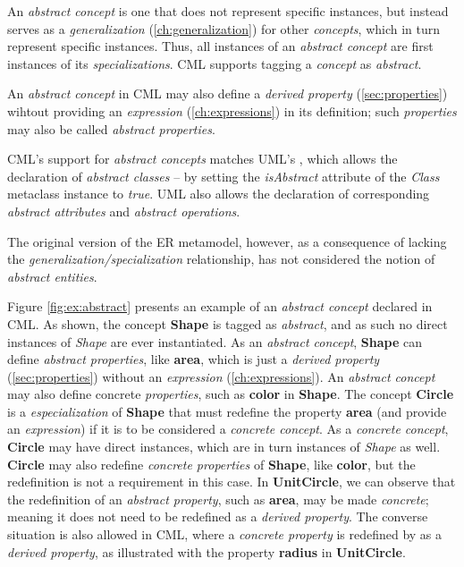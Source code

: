 An \emph{abstract concept} is one that does not represent specific instances,
but instead serves as a \emph{generalization} (\ref{ch:generalization}) 
for other \emph{concepts},
which in turn represent specific instances.
Thus, all instances of an \emph{abstract concept}
are first instances of its \emph{specializations}.
CML supports tagging a \emph{concept} as \emph{abstract}.

An \emph{abstract concept} in CML may also define a \emph{derived property} (\ref{sec:properties})
wihtout providing an \emph{expression} (\ref{ch:expressions}) in its definition;
such \emph{properties} may also be called \emph{abstract properties}.

CML's support for \emph{abstract concepts} matches UML's \cite{uml},
which allows the declaration of \emph{abstract classes}
-- by setting the \emph{isAbstract} attribute of the \emph{Class} metaclass instance to \emph{true}.
UML also allows the declaration of corresponding \emph{abstract attributes} and \emph{abstract operations}.

The original version of the ER \cite{er} metamodel, however,
as a consequence of lacking the \emph{generalization/specialization} relationship,
has not considered the notion of \emph{abstract entities}.

\begin{examples}
Figure \ref{fig:ex:abstract} presents an example of an \emph{abstract concept} declared in CML.
As shown, the concept \textbf{Shape} is tagged as \emph{abstract},
and as such no direct instances of \emph{Shape} are ever instantiated.
As an \emph{abstract concept}, \textbf{Shape} can define \emph{abstract properties},
like \textbf{area}, which is just a \emph{derived property} (\ref{sec:properties})
without an \emph{expression} (\ref{ch:expressions}).
An \emph{abstract concept} may also define concrete \emph{properties},
such as \textbf{color} in \textbf{Shape}.
The concept \textbf{Circle} is a \emph{especialization} of \textbf{Shape}
that must redefine the property \textbf{area}
(and provide an \emph{expression})
if it is to be considered a \emph{concrete concept}.
As a \emph{concrete concept},
\textbf{Circle} may have direct instances,
which are in turn instances of \emph{Shape} as well.
\textbf{Circle} may also redefine \emph{concrete properties} of \textbf{Shape},
like \textbf{color},
but the redefinition is not a requirement in this case.
In \textbf{UnitCircle},
we can observe that the redefinition of an \emph{abstract property},
such as \textbf{area},
may be made \emph{concrete};
meaning it does not need to be redefined as a \emph{derived property}.
The converse situation is also allowed in CML,
where a \emph{concrete property} is redefined by as a \emph{derived property},
as illustrated with the property \textbf{radius} in \textbf{UnitCircle}.
\end{examples}

